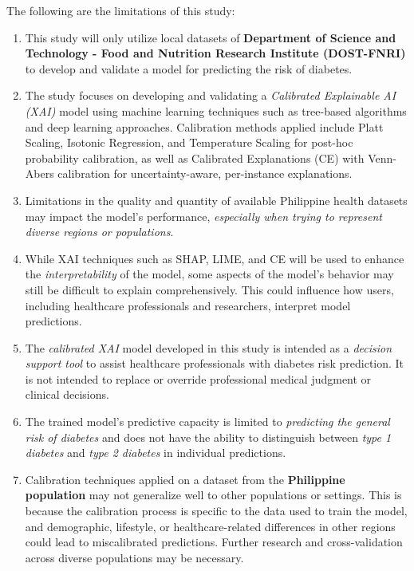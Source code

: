 The following are the limitations of this study:

\begin{enumerate}
    \item This study will only utilize local datasets of \textbf{Department of Science and Technology - Food and Nutrition Research Institute (DOST-FNRI)} to develop and validate a model for predicting the risk of diabetes.
    
    \item The study focuses on developing and validating a \textit{Calibrated Explainable AI (XAI)} model using machine learning techniques such as tree-based algorithms and deep learning approaches. Calibration methods applied include Platt Scaling, Isotonic Regression, and Temperature Scaling for post-hoc probability calibration, as well as Calibrated Explanations (CE) with Venn-Abers calibration for uncertainty-aware, per-instance explanations.
    
    \item Limitations in the quality and quantity of available Philippine health datasets may impact the model's performance, \textit{especially when trying to represent diverse regions or populations}.
    
    \item While XAI techniques such as SHAP, LIME, and CE will be used to enhance the \textit{interpretability} of the model, some aspects of the model's behavior may still be difficult to explain comprehensively. This could influence how users, including healthcare professionals and researchers, interpret model predictions.
    
    \item The \textit{calibrated XAI} model developed in this study is intended as a \textit{decision support tool} to assist healthcare professionals with diabetes risk prediction. It is not intended to replace or override professional medical judgment or clinical decisions.
    
    \item The trained model's predictive capacity is limited to \textit{predicting the general risk of diabetes} and does not have the ability to distinguish between \textit{type 1 diabetes} and \textit{type 2 diabetes} in individual predictions.
    
    \item Calibration techniques applied on a dataset from the \textbf{Philippine population} may not generalize well to other populations or settings. This is because the calibration process is specific to the data used to train the model, and demographic, lifestyle, or healthcare-related differences in other regions could lead to miscalibrated predictions. Further research and cross-validation across diverse populations may be necessary.


\end{enumerate}

